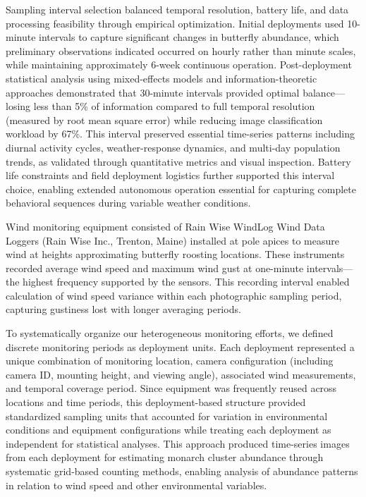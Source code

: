 Sampling interval selection balanced temporal resolution, battery life, and data processing feasibility through empirical optimization. Initial deployments used 10-minute intervals to capture significant changes in butterfly abundance, which preliminary observations indicated occurred on hourly rather than minute scales, while maintaining approximately 6-week continuous operation. Post-deployment statistical analysis using mixed-effects models and information-theoretic approaches demonstrated that 30-minute intervals provided optimal balance—losing less than 5\% of information compared to full temporal resolution (measured by root mean square error) while reducing image classification workload by 67\%. This interval preserved essential time-series patterns including diurnal activity cycles, weather-response dynamics, and multi-day population trends, as validated through quantitative metrics and visual inspection. Battery life constraints and field deployment logistics further supported this interval choice, enabling extended autonomous operation essential for capturing complete behavioral sequences during variable weather conditions.

Wind monitoring equipment consisted of Rain Wise WindLog Wind Data Loggers (Rain Wise Inc., Trenton, Maine) installed at pole apices to measure wind at heights approximating butterfly roosting locations. These instruments recorded average wind speed and maximum wind gust at one-minute intervals—the highest frequency supported by the sensors. This recording interval enabled calculation of wind speed variance within each photographic sampling period, capturing gustiness lost with longer averaging periods. 

To systematically organize our heterogeneous monitoring efforts, we defined discrete monitoring periods as deployment units. Each deployment represented a unique combination of monitoring location, camera configuration (including camera ID, mounting height, and viewing angle), associated wind measurements, and temporal coverage period. Since equipment was frequently reused across locations and time periods, this deployment-based structure provided standardized sampling units that accounted for variation in environmental conditions and equipment configurations while treating each deployment as independent for statistical analyses. This approach produced time-series images from each deployment for estimating monarch cluster abundance through systematic grid-based counting methods, enabling analysis of abundance patterns in relation to wind speed and other environmental variables.

